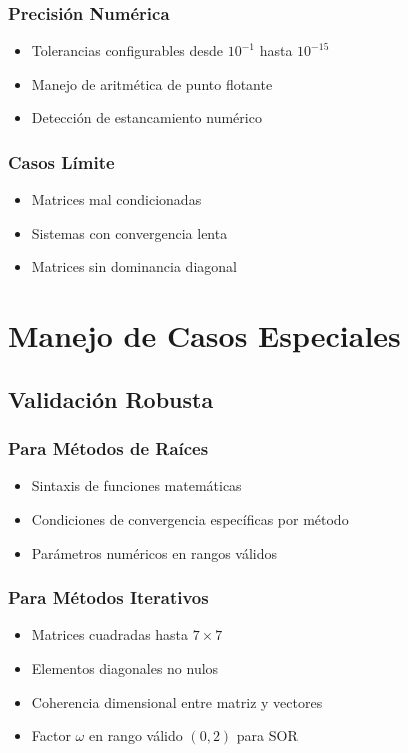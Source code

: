 \subsubsection{Precisión Numérica}
\begin{itemize}
    \item Tolerancias configurables desde $10^{-1}$ hasta $10^{-15}$
    \item Manejo de aritmética de punto flotante
    \item Detección de estancamiento numérico
\end{itemize}

\subsubsection{Casos Límite}
\begin{itemize}
    \item Matrices mal condicionadas
    \item Sistemas con convergencia lenta
    \item Matrices sin dominancia diagonal
\end{itemize}

\section{Manejo de Casos Especiales}

\subsection{Validación Robusta}

\subsubsection{Para Métodos de Raíces}
\begin{itemize}
    \item Sintaxis de funciones matemáticas
    \item Condiciones de convergencia específicas por método
    \item Parámetros numéricos en rangos válidos
\end{itemize}

\subsubsection{Para Métodos Iterativos}
\begin{itemize}
    \item Matrices cuadradas hasta $7 \times 7$
    \item Elementos diagonales no nulos
    \item Coherencia dimensional entre matriz y vectores
    \item Factor $\omega$ en rango válido $(0, 2)$ para SOR
\end{itemize}

